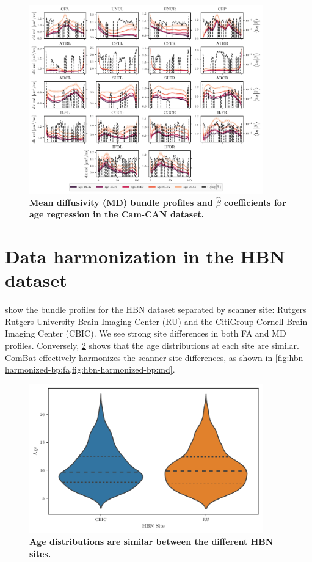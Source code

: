 \documentclass[10pt,letterpaper]{article}
\begin{document}
\begin{figure}
    \includegraphics[width=0.9\textwidth]{cc_coefs_profiles_md.pdf}
    \caption{%
        {%
            \bf Mean diffusivity (MD) bundle profiles and $\hat{\beta}$
            coefficients for age regression in the Cam-CAN dataset.
        }
        \label{fig:cc-bp:md}
    }
\end{figure}

\section{Data harmonization in the HBN dataset}

 show the bundle profiles for the HBN dataset separated by scanner site: Rutgers Rutgers University Brain Imaging Center (RU) and the CitiGroup Cornell Brain Imaging Center (CBIC). We see strong site differences in both FA and MD profiles. Conversely, \cref{fig:hbn-site-age-dist} shows that the age distributions at each site are similar. ComBat effectively harmonizes the scanner site differences, as shown in \cref{fig:hbn-harmonized-bp:fa,fig:hbn-harmonized-bp:md}.

\begin{figure}
    \includegraphics[width=0.9\textwidth]{hbn_site_age_distributions.pdf}
    \caption{%
        {%
            \bf Age distributions are similar between the different
            HBN sites.
        }
        \label{fig:hbn-site-age-dist}
    }
\end{figure}
\end{document}
